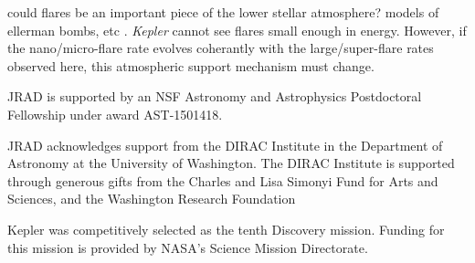 \documentclass[preprint2]{aastex62}
\newcommand{\Kepler}{\textsl{Kepler}\xspace}
\begin{document}
could flares be an important piece of the lower stellar atmosphere? models of ellerman bombs, etc \citep[e.g.][]{hansteen2017}. \Kepler cannot see flares small enough in energy. However, if the nano/micro-flare rate evolves coherantly with the large/super-flare rates observed here, this atmospheric support mechanism must change.





\acknowledgments
JRAD is supported by an NSF Astronomy and Astrophysics Postdoctoral Fellowship under award AST-1501418.

JRAD acknowledges support from the DIRAC Institute in the Department of Astronomy at the University of Washington. The DIRAC Institute is supported through generous gifts from the Charles and Lisa Simonyi Fund for Arts and Sciences, and the Washington Research Foundation


Kepler was competitively selected as the tenth Discovery mission. Funding for this mission is provided by NASA's Science Mission Directorate.




\end{document}
